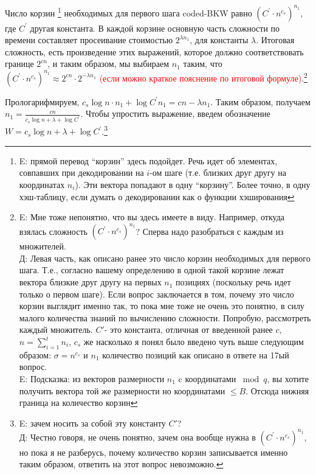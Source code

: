 \documentclass[a4paper,11pt]{article}
\begin{document}
Число корзин \footnote{E: прямой перевод ``корзин'' здесь подойдет. Речь идет об элементах, совпавших при декодировании на $i$-ом шаге (т.е. близких друг другу на координатах $n_i$). Эти вектора попадают в одну ``корзину''. Более точно, в одну хэш-таблицу, если думать о декодировании как о функции хэширования} необходимых для первого шага coded-BKW равно $(C^{'} \cdot n^{c_s})^{n_1}$, где $C^{'}$ другая константа. В каждой корзине основную часть сложности по времени составляет просеивание стоимостью $2^{\lambda n_1}$, для константы $\lambda$. Итоговая сложность, есть произведение этих выражений, которое должно соответствовать границе $2^{cn}$, и таким образом, мы выбираем $n_1$ таким, что $(C^{'} \cdot n^{c_s})^{n_1} \approx 2^{cn} \cdot 2^{- \lambda n_1}$ \textcolor{red}{(если можно краткое пояснение по итоговой формуле)}.\footnote{E: Мне тоже непонятно, что вы здесь имеете в виду. Например, откуда взялась сложность $(C^{'} \cdot n^{c_s})^{n_1}$? Сперва надо разобраться с каждым из множителей. \\ Д: Левая часть, как описано ранее это число корзин необходимых для первого шага. Т.е., согласно вашему определению в одной такой корзине лежат вектора близкие друг другу на первых $n_1$ позициях (поскольку речь идет только о первом шаге). Если вопрос заключается в том, почему это число корзин выглядит именно так, то пока мне тоже не очень это понятно, в силу малого количества знаний по вычислению сложности. Попробую, рассмотреть каждый множитель. $C'$- это константа, отличная от введенной ранее $c$, $n = \sum_{i=1}^{t} n_i$, $c_s$ же насколько я понял было введено чуть выше следующим образом: $\sigma = n^{c_s}$ и $n_1$ количество позиций как описано в ответе на 17ый вопрос.\\
E: Подсказка: из векторов размерности $n_1$ c координатами $\bmod q$, вы хотите получить вектора той же размерности но координатами $\leq B$. Отсюда нижняя граница на количество корзин
}

Прологарифмируем, $c_s \log{n} \cdot n_1 + \log{C^{'}} n_1 = cn - \lambda n_1$. Таким образом, получаем $n_1 = \frac{cn}{c_s \log{n} + \lambda + \log{C^{'}}}$. Чтобы упростить выражение, введем обозначение $W=c_s \log{n} + \lambda + \log{C^{'}}$.\footnote{E: зачем носить за собой эту константу $C'$? \\ Д: Честно говоря, не очень понятно, зачем она вообще нужна в $(C^{'} \cdot n^{c_s})^{n_1}$, но пока я не разберусь, почему количество корзин записывается именно таким образом, ответить на этот вопрос невозможно.}
\end{document}
